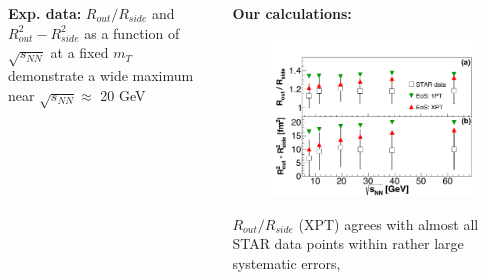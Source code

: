\documentclass[dvipsnames] {beamer}
\begin{document}
\begin{frame}
\begin{columns}[t]
         
          
                 {\scriptsize 
                   \begin{block}{\bf \centering \scriptsize Exp. data:}
                     $R_{out} / R_{side}$ and $R_{out}^{2} - R_{side}^{2}$ as a function of
                     $\sqrt{s_{NN}}$ at a fixed $m_{T}$ demonstrate a wide maximum near
                     $\sqrt{s_{NN}} \approx$ 20 GeV
                   \end{block}
                 }
                 \vskip -0.4cm
           \begin{block}{\bf \centering \scriptsize Our calculations: }
             \begin{figure}[H]
               \includegraphics[width=1.0\linewidth]{fig5_modif.pdf}
             \end{figure}
             \vskip -0.65cm
             {\scriptsize $R_{out} / R_{side}$ (XPT) agrees with almost all STAR data points within rather large systematic errors,
}
\end{block}
\end{columns}
\end{frame}
\end{document}
